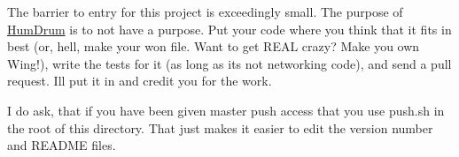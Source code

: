 The barrier to entry for this project is exceedingly small. The purpose of \hyperlink{namespaceHumDrum}{Hum\+Drum} is to not have a purpose. Put your code where you think that it fits in best (or, hell, make your won file. Want to get R\+E\+AL crazy? Make you own Wing!), write the tests for it (as long as it\textquotesingle{}s not networking code), and send a pull request. I\textquotesingle{}ll put it in and credit you for the work.

I do ask, that if you have been given master push access that you use push.\+sh in the root of this directory. That just makes it easier to edit the version number and R\+E\+A\+D\+ME files. 